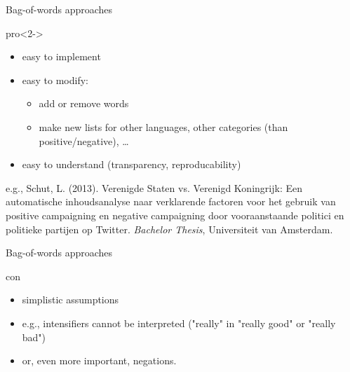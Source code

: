 \documentclass{beamer}
\begin{document}
%
%
%	



\begin{frame}{Bag-of-words approaches}
	\begin{block}{pro}<2->
		\begin{itemize}
			\item easy to implement
			\item easy to modify:
			\begin{itemize}
				\item add or remove words
				\item make new lists for other languages, other categories (than positive/negative), \dots
			\end{itemize}
			\item easy to understand (transparency, reproducability)
		\end{itemize}
	\end{block}
	\par
	\tiny{e.g., Schut, L. (2013). Verenigde Staten vs. Verenigd Koningrijk: Een automatische inhoudsanalyse naar verklarende factoren voor het gebruik van positive campaigning en negative campaigning door vooraanstaande politici en politieke partijen op Twitter. \emph{Bachelor Thesis}, Universiteit van Amsterdam.}\\
\end{frame}



\begin{frame}{Bag-of-words approaches}
	\begin{block}{con}
		\begin{itemize}
			\item simplistic assumptions
			\item e.g., intensifiers cannot be interpreted ("really" in "really good" or "really bad")
			\item or, even more important, negations.
		\end{itemize}
	\end{block}
\end{frame}
\end{document}
